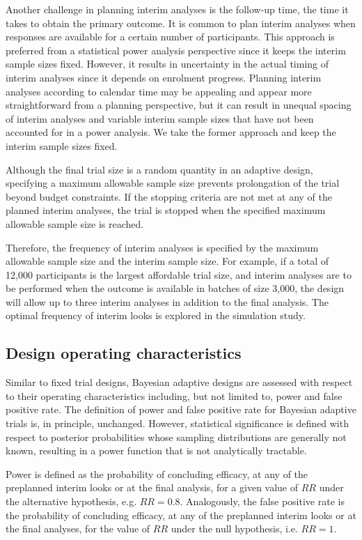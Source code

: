 \documentclass[12pt]{article}
\begin{document}
Another challenge in planning interim analyses is the follow-up time, the time it takes to obtain the primary outcome.  It is common to plan interim analyses when responses are available for a certain number of participants. This approach is preferred from a statistical power analysis perspective since it keeps the interim sample sizes fixed. However, it results in uncertainty in the actual timing of interim analyses since it depends on enrolment progress. Planning interim analyses according to calendar time may be appealing and appear more straightforward from a planning perspective, but it can result in unequal spacing of interim analyses and variable interim sample sizes that have not been accounted for in a power analysis. We take the former approach and keep the interim sample sizes fixed. 

Although the final trial size is a random quantity in an adaptive design, specifying a maximum allowable sample size prevents prolongation of the trial beyond budget constraints. If the stopping criteria are not met at any of the planned interim analyses, the trial is stopped when the specified maximum allowable sample size is reached.

 Therefore, the frequency of interim analyses is specified by the maximum allowable sample size and the interim sample size. For example, if a total of 12,000 participants is the largest affordable trial size, and interim analyses are to be performed when the outcome is available in batches of size 3,000, the design will allow up to three interim analyses in addition to the final analysis. The optimal frequency of interim looks is explored in the simulation study.

\subsection{Design operating characteristics}
\label{doc}
Similar to fixed trial designs, Bayesian adaptive designs are assessed with respect to their operating characteristics including, but not limited to, power and false positive rate. The definition of power and false positive rate for Bayesian adaptive trials is, in principle, unchanged. However, statistical significance is defined with respect to posterior probabilities whose sampling distributions are generally not known, resulting in a power function that is not analytically tractable. 

Power is defined as the probability of concluding efficacy, at any of the preplanned interim looks or at the final analysis, for a given value of $RR$ under the alternative hypothesis, e.g. $RR = 0.8$. Analogously, the false positive rate is the probability of concluding efficacy, at any of the preplanned interim looks or at the final analyses, for the value of $RR$ under the null hypothesis, i.e. $RR = 1$.
\end{document}
